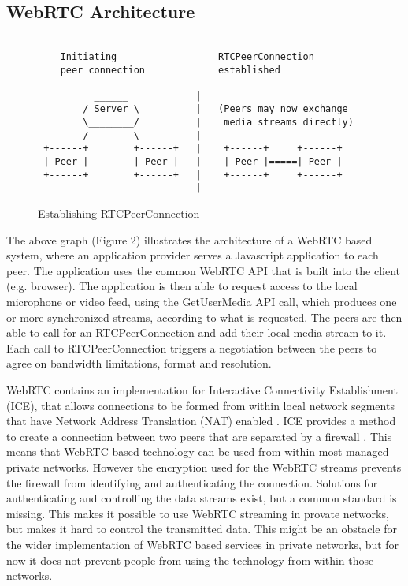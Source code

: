 \documentclass[english,12pt,a4paper,pdftex]{article}
\begin{document}
\subsection{WebRTC Architecture}

\begin{figure}
\begin{verbatim}

    Initiating                  RTCPeerConnection
    peer connection             established
    
          ______            |
        / Server \          |   (Peers may now exchange 
        \________/          |    media streams directly)
        /        \          |
 +------+        +------+   |    +------+     +------+
 | Peer |        | Peer |   |    | Peer |=====| Peer |
 +------+        +------+   |    +------+     +------+
                            |
\end{verbatim}
\caption{Establishing RTCPeerConnection}
\label{fig:peer-connection}
\end{figure}

The above graph (Figure 2) illustrates the architecture of a WebRTC based system, where an application provider serves a Javascript application to each peer. The application uses the common WebRTC API that is built into the client (e.g. browser). The application is then able to request access to the local microphone or video feed, using the GetUserMedia API call, which produces one or more synchronized streams, according to what is requested. The peers are then able to call for an RTCPeerConnection and add their local media stream to it. Each call to RTCPeerConnection triggers a negotiation between the peers to agree on bandwidth limitations, format and resolution. \cite{Jennings} \cite{Garaizar}

WebRTC contains an implementation for Interactive Connectivity Establishment (ICE), that allows connections to be formed from within local network segments that have Network Address Translation (NAT) enabled \cite{Jennings} \cite{Johnston}. ICE provides a method to create a connection between two peers that are separated by a firewall \cite{Rosenberg}. This means that WebRTC based technology can be used from within most managed private networks. However the encryption used for the WebRTC streams prevents the firewall from identifying and authenticating the connection. Solutions for authenticating and controlling the data streams exist, but a common standard is missing. This makes it possible to use WebRTC streaming in provate networks, but makes it hard to control the transmitted data. \cite{Johnston} This might be an obstacle for the wider implementation of WebRTC based services in private networks, but for now it does not prevent people from using the technology from within those networks.
\end{document}
